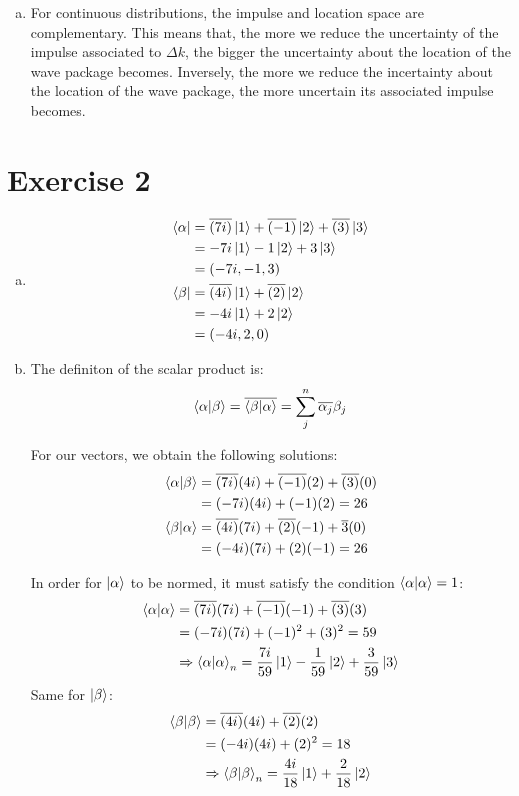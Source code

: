 \documentclass[a4paper,german,12pt,smallheadings]{scrartcl}
\begin{document}
\begin{enumerate}[a)]
\item For continuous distributions, the impulse and location space are complementary.
This means that, the more we reduce the uncertainty of the impulse associated to $\Delta k$, the bigger the uncertainty about the location of the wave package becomes. Inversely, the more we reduce the incertainty about the location of the wave package, the more uncertain its associated impulse becomes.

\end{enumerate}

\section*{Exercise 2}

\begin{enumerate}[(a)]

\item
\begin{align*}
\bra{\alpha}&=\overline{(7i)}\ket{1}+\overline{(-1)}\ket{2}+\overline{(3)}\ket{3}\\
&=-7i\ket{1}-1\ket{2}+3\ket{3}\\
&=(-7i,-1,3)\\
\bra{\beta}&=\overline{(4i)}\ket{1}+\overline{(2)}\ket{2}\\
&=-4i\ket{1}+2\ket{2}\\
&=(-4i,2,0)
\end{align*}

\item The definiton of the scalar product is:
\begin{equation*}
\braket{\alpha|\beta}=\overline{\braket{\beta|\alpha}}=\sum_{j}^{n}\overline{\alpha_j}\beta_j
\end{equation*}

For our vectors, we obtain the following solutions:
\begin{align*}
\braket{\alpha|\beta}&=\overline{(7i)}(4i) +\overline{(-1)}(2) + \overline{(3)}(0)\\
&=(-7i)(4i)+(-1)(2)=26\\
\braket{\beta|\alpha}&=\overline{(4i)}(7i)+\overline{(2)}(-1)+\overline{3}(0)\\
&=(-4i)(7i)+(2)(-1)=26
\end{align*}

In order for $\ket{\alpha}$ to be normed, it must satisfy the condition $\braket{\alpha|\alpha}=1$:
\begin{align*}
\braket{\alpha|\alpha}&=\overline{(7i)}(7i)+\overline{(-1)}(-1)+\overline{(3)}(3)\\
&=(-7i)(7i)+(-1)^2+(3)^2=59\\
&\Rightarrow \braket{\alpha|\alpha}_n=\frac{7i}{59}\ket{1}-\frac{1}{59}\ket{2}+\frac{3}{59}\ket{3}
\end{align*}
Same for $\ket{\beta}$:
\begin{align*}
\braket{\beta|\beta}&=\overline{(4i)}(4i)+\overline{(2)}(2)\\
&=(-4i)(4i)+(2)^2=18\\
&\Rightarrow \braket{\beta|\beta}_n=\frac{4i}{18}\ket{1}+\frac{2}{18}\ket{2}
\end{align*}


\end{enumerate}
\end{document}
